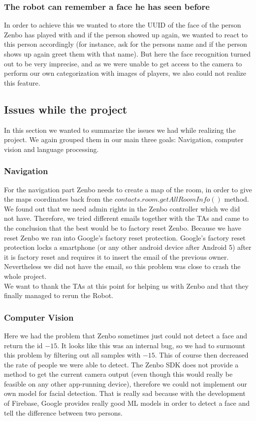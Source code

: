 \documentclass[conference]{IEEEtran}
\begin{document}
\subsubsection{The robot can remember a face he has seen before}
In order to achieve this we wanted to store the UUID of the face of the person Zenbo has played with and if the person showed up again, we wanted to
react to this person accordingly (for instance, ask for the persons name and if the person shows up again greet them with that name).
But here the face recognition turned out to be very imprecise, and as we were unable to get access to the camera to perform our own categorization with images of players, we also could not realize this feature.
\subsection{Issues while the project}
In this section we wanted to summarize the issues we had while realizing the project. We again grouped them in our 
main three goals: Navigation, computer vision and language processing.
\subsubsection{Navigation}
For the navigation part Zenbo needs to create a map of the room, in order to give the maps coordinates back from the $contacts.room.getAllRoomInfo()$ method.\\
We found out that we need admin rights in the Zenbo controller which we did not have. Therefore, we tried different emails together with the TAs 
and came to the conclusion that the best would be to factory reset Zenbo. Because we have reset Zenbo we ran into Google's factory reset protection.
Google's factory reset protection locks a smartphone (or any other android device after Android 5) 
after it is factory reset and requires it to insert the email of the previous owner. 
Nevertheless we did not have the email, so this problem was close to crash the whole project.\\
We want to thank the TAs at this point for helping us with Zenbo and that they finally managed to rerun the Robot.
\subsubsection{Computer Vision}
Here we had the problem that Zenbo sometimes just could not detect a face and return the id $-15$. 
It looks like this was an internal bug, so we had to surmount this problem by filtering out all samples with $-15$.
This of course then decreased the rate of people we were able to detect.
The Zenbo SDK does not provide a method to get the current camera output (even though this would really be feasible on any other app-running device),
therefore we could not implement our own model for facial detection. That is really sad because with the development of Firebase, Google provides
really good ML models in order to detect a face and tell the difference between two persons.
\end{document}
